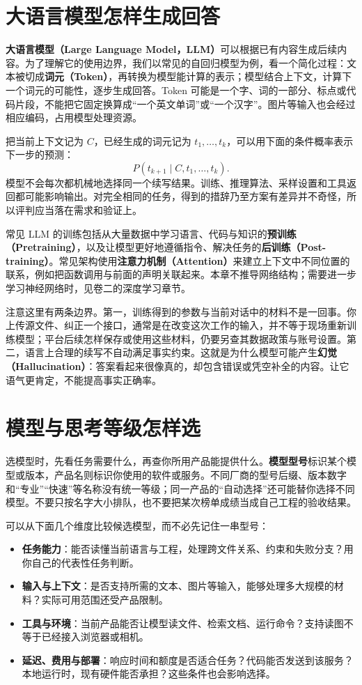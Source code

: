 \section{大语言模型怎样生成回答}
\label{sec:ai-llm}

\textbf{大语言模型（Large Language Model，LLM）}可以根据已有内容生成后续内容。为了理解它的使用边界，我们以常见的自回归模型为例，看一个简化过程：文本被切成\textbf{词元（Token）}，再转换为模型能计算的表示；模型结合上下文，计算下一个词元的可能性，逐步生成回答。Token 可能是一个字、词的一部分、标点或代码片段，不能把它固定换算成“一个英文单词”或“一个汉字”。图片等输入也会经过相应编码，占用模型处理资源。

把当前上下文记为 $C$，已经生成的词元记为 $t_1,\ldots,t_k$，可以用下面的条件概率表示下一步的预测：
\[
    P(t_{k+1}\mid C,t_1,\ldots,t_k).
\]
模型不会每次都机械地选择同一个续写结果。训练、推理算法、采样设置和工具返回都可能影响输出。对完全相同的任务，得到的措辞乃至方案有差异并不奇怪，所以评判应当落在需求和验证上。

常见 LLM 的训练包括从大量数据中学习语言、代码与知识的\textbf{预训练（Pretraining）}，以及让模型更好地遵循指令、解决任务的\textbf{后训练（Post-training）}。常见架构使用\textbf{注意力机制（Attention）}来建立上下文中不同位置的联系，例如把函数调用与前面的声明关联起来。本章不推导网络结构；需要进一步学习神经网络时，见卷二的深度学习章节。

注意这里有两条边界。第一，训练得到的参数与当前对话中的材料不是一回事。你上传源文件、纠正一个接口，通常是在改变这次工作的输入，并不等于现场重新训练模型；平台后续怎样保存或使用这些材料，仍要另查其数据政策与账号设置。第二，语言上合理的续写不自动满足事实约束。这就是为什么模型可能产生\textbf{幻觉（Hallucination）}：答案看起来很像真的，却包含错误或凭空补全的内容。让它语气更肯定，不能提高事实正确率。

\section{模型与思考等级怎样选}
\label{sec:ai-model-choice}

选模型时，先看任务需要什么，再查你所用产品能提供什么。\textbf{模型型号}标识某个模型或版本，产品名则标识你使用的软件或服务。不同厂商的型号后缀、版本数字和“专业”“快速”等名称没有统一等级；同一产品的“自动选择”还可能替你选择不同模型。不要只按名字大小排队，也不要把某次榜单成绩当成自己工程的验收结果。

可以从下面几个维度比较候选模型，而不必先记住一串型号：
\begin{itemize}
    \item \textbf{任务能力}：能否读懂当前语言与工程，处理跨文件关系、约束和失败分支？用你自己的代表性任务判断。
    \item \textbf{输入与上下文}：是否支持所需的文本、图片等输入，能够处理多大规模的材料？实际可用范围还受产品限制。
    \item \textbf{工具与环境}：当前产品能否让模型读文件、检索文档、运行命令？支持读图不等于已经接入浏览器或相机。
    \item \textbf{延迟、费用与部署}：响应时间和额度是否适合任务？代码能否发送到该服务？本地运行时，现有硬件能否承担？这些条件也会影响选择。
\end{itemize}

